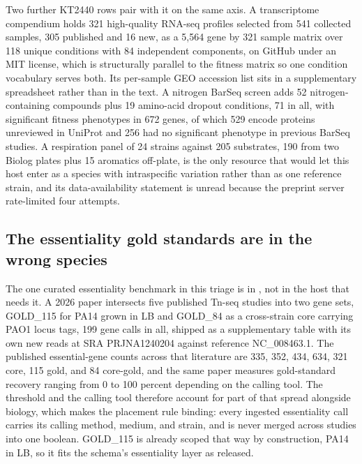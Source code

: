 Two further KT2440 rows pair with it on the same axis. A transcriptome compendium holds 321
high-quality RNA-seq profiles selected from 541 collected samples, 305 published and 16 new, as
a 5,564 gene by 321 sample matrix over 118 unique conditions with 84 independent components, on
GitHub under an MIT license, which is structurally parallel to the fitness matrix so one
condition vocabulary serves both. Its per-sample GEO accession list sits in a supplementary
spreadsheet rather than in the text. A nitrogen BarSeq screen adds 52 nitrogen-containing
compounds plus 19 amino-acid dropout conditions, 71 in all, with significant fitness phenotypes
in 672 genes, of which 529 encode proteins unreviewed in UniProt and 256 had no significant
phenotype in previous BarSeq studies. A respiration panel of 24 strains against 205
substrates, 190 from two Biolog plates plus 15 aromatics off-plate, is the only resource that
would let this host enter as a species with intraspecific variation rather than as one
reference strain, and its data-availability statement is unread because the preprint server
rate-limited four attempts.

\subsection{The essentiality gold standards are in the wrong species}\label{sec:pseudo-ess}

The one curated essentiality benchmark in this triage is in , not in the
host that needs it. A 2026 paper intersects five published Tn-seq studies into two gene sets,
GOLD\_115 for PA14 grown in LB and GOLD\_84 as a cross-strain core carrying PAO1 locus tags,
199 gene calls in all, shipped as a supplementary table with its own new reads at SRA
PRJNA1240204 against reference NC\_008463.1. The published essential-gene counts across that
literature are 335, 352, 434, 634, 321 core, 115 gold, and 84 core-gold, and the same paper
measures gold-standard recovery ranging from 0 to 100 percent depending on the calling tool.
The threshold and the calling tool therefore account for part of that spread alongside biology,
which makes the placement rule binding: every ingested essentiality call carries its calling
method, medium, and strain, and is never merged across studies into one boolean. GOLD\_115 is
already scoped that way by construction, PA14 in LB, so it fits the schema's essentiality layer
as released.

